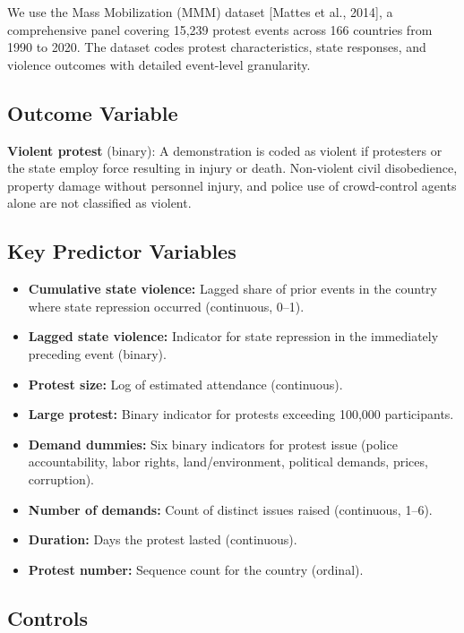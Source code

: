 \documentclass[11pt,a4paper]{article}
\begin{document}
We use the Mass Mobilization (MMM) dataset [Mattes et al., 2014], a comprehensive panel covering 15,239 protest events across 166 countries from 1990 to 2020. The dataset codes protest characteristics, state responses, and violence outcomes with detailed event-level granularity.

\subsection{Outcome Variable}

\textbf{Violent protest} (binary): A demonstration is coded as violent if protesters or the state employ force resulting in injury or death. Non-violent civil disobedience, property damage without personnel injury, and police use of crowd-control agents alone are not classified as violent.

\subsection{Key Predictor Variables}

\begin{itemize}
    \item \textbf{Cumulative state violence:} Lagged share of prior events in the country where state repression occurred (continuous, 0--1).
    \item \textbf{Lagged state violence:} Indicator for state repression in the immediately preceding event (binary).
    \item \textbf{Protest size:} Log of estimated attendance (continuous).
    \item \textbf{Large protest:} Binary indicator for protests exceeding 100,000 participants.
    \item \textbf{Demand dummies:} Six binary indicators for protest issue (police accountability, labor rights, land/environment, political demands, prices, corruption).
    \item \textbf{Number of demands:} Count of distinct issues raised (continuous, 1--6).
    \item \textbf{Duration:} Days the protest lasted (continuous).
    \item \textbf{Protest number:} Sequence count for the country (ordinal).
\end{itemize}

\subsection{Controls}
\end{document}
